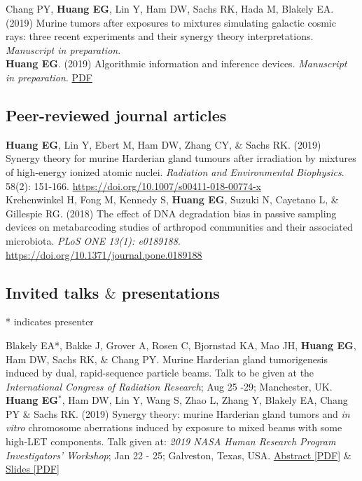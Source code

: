 \documentclass[10pt, letterpaper]{article}
\newcommand{\years}[1]{\marginnote{\scriptsize #1}}
\begin{document}
\years{2019} Chang PY, \textbf{Huang EG}, Lin Y, Ham DW, Sachs RK,  Hada M, Blakely EA. (2019) Murine tumors after exposures to mixtures simulating galactic cosmic rays: three recent experiments and their synergy theory interpretations. \emph{Manuscript in preparation}.\\

\years{2019}\textbf{Huang EG}. (2019) Algorithmic information and inference devices. \emph{Manuscript in preparation}. \href{https://nbviewer.jupyter.org/github/eghuang/inferenceDevices/blob/master/inference_devices.pdf}{PDF}

\subsection*{Peer-reviewed journal articles}

\years{2019}\textbf{Huang EG}, Lin Y, Ebert M, Ham DW, Zhang CY, \& Sachs RK. (2019) Synergy theory for murine Harderian gland tumours after irradiation by mixtures of high-energy ionized atomic nuclei. \emph{Radiation and Environmental Biophysics}. 58(2): 151-166. \href{https://doi.org/10.1007/s00411-018-00774-x}{https://doi.org/10.1007/s00411-018-00774-x}\\

\years{2018}Krehenwinkel H, Fong M, Kennedy S, \textbf{Huang EG}, Suzuki N, Cayetano L, \& Gillespie RG. (2018) The effect of DNA degradation bias in passive sampling devices on metabarcoding studies of arthropod communities and their associated microbiota. \emph{PLoS ONE 13(1): e0189188}. \\ \href{https://doi.org/10.1371/journal.pone.0189188}{https://doi.org/10.1371/journal.pone.0189188}\\

\subsection*{Invited talks $\&$ presentations} * indicates presenter\\
\noindent

\years{2019}Blakely EA*, Bakke J, Grover A, Rosen C, Bjornstad KA, Mao JH, \textbf{Huang EG}, Ham DW, Sachs RK, $\&$ Chang PY. Murine Harderian gland tumorigenesis induced by dual, rapid-sequence particle beams. Talk to be given at the \emph{International Congress of Radiation Research}; Aug 25 -29; Manchester, UK.\\

\years{2019}\textbf{Huang EG}$^{*}$, Ham DW, Lin Y, Wang S, Zhao L, Zhang Y, Blakely EA, Chang PY $\&$ Sachs RK. (2019) Synergy theory: murine Harderian gland tumors and \textit{in vitro} chromosome aberrations induced by exposure to mixed beams with some high-LET components. Talk given at: \emph{2019 NASA Human Research Program Investigators' Workshop}; Jan 22 - 25; Galveston, Texas, USA. \href{https://nbviewer.jupyter.org/github/sachsURAP/NASA_HRP_2019/blob/master/hrp_abstract.pdf}{Abstract [PDF]} $ \& $ \href{https://nbviewer.jupyter.org/github/sachsURAP/NASA_HRP_2019/blob/master/hrp_slides.pdf}{Slides [PDF]}\\
\end{document}
